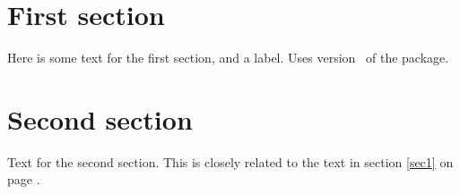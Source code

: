\documentclass[a4paper]{article}
\begin{document}
\makeRR   %
\section{First section}
Here is some text for the first section, and a label\label{sec1}.
Uses version \RRfileversion\ of the package.\newpage
\section{Second section}
Text for the second section. This is closely related to the text in
section \ref{sec1} on page \pageref{sec1}. \newpage
\tableofcontents
\end{document}
